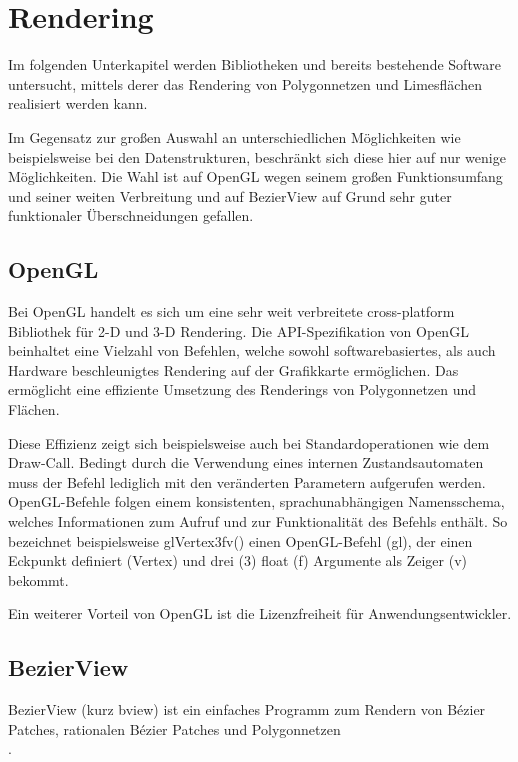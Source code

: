 \section{Rendering}

Im folgenden Unterkapitel werden Bibliotheken und bereits bestehende Software untersucht, mittels derer das Rendering von Polygonnetzen und Limesflächen realisiert werden kann.

Im Gegensatz zur großen Auswahl an unterschiedlichen Möglichkeiten wie beispielsweise bei den Datenstrukturen, beschränkt sich diese hier auf nur wenige Möglichkeiten. Die Wahl ist auf OpenGL wegen seinem großen Funktionsumfang und seiner weiten Verbreitung und auf BezierView auf Grund sehr guter funktionaler Überschneidungen gefallen.


\subsection{OpenGL}

Bei OpenGL handelt es sich um eine sehr weit verbreitete cross-platform Bibliothek für 2-D und 3-D Rendering.
Die API-Spezifikation von OpenGL beinhaltet eine Vielzahl von Befehlen, welche sowohl softwarebasiertes, als auch Hardware beschleunigtes Rendering auf der Grafikkarte ermöglichen. Das ermöglicht eine effiziente Umsetzung des Renderings von Polygonnetzen und Flächen.

Diese Effizienz zeigt sich beispielsweise auch bei Standardoperationen wie dem Draw-Call. Bedingt durch die Verwendung eines internen Zustandsautomaten muss der Befehl lediglich mit den veränderten Parametern aufgerufen werden. OpenGL-Befehle folgen einem konsistenten, sprachunabhängigen Namensschema, welches Informationen zum Aufruf und zur Funktionalität des Befehls enthält. So bezeichnet beispielsweise glVertex3fv() einen OpenGL-Befehl (gl), der einen Eckpunkt definiert (Vertex) und drei (3) float (f) Argumente als Zeiger (v) bekommt.

Ein weiterer Vorteil von OpenGL ist die Lizenzfreiheit für Anwendungsentwickler.


\subsection{BezierView}

BezierView (kurz bview) ist ein einfaches Programm zum Rendern von Bézier Patches, rationalen Bézier Patches und Polygonnetzen 
\\\cite{Peters.bview.27.07.2015}.

